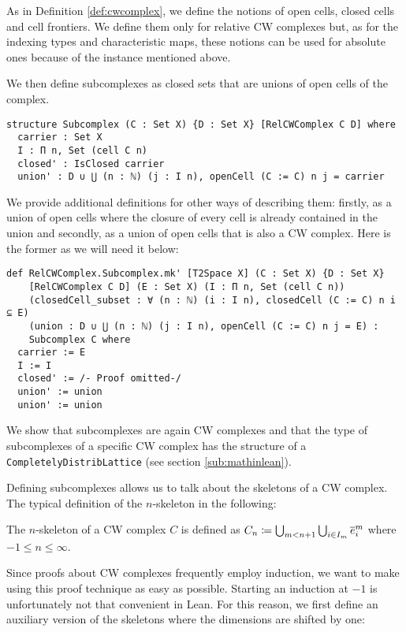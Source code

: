 As in Definition \ref{def:cwcomplex}, we define the notions of open cells, closed cells and cell frontiers.
We define them only for relative CW complexes but, as for the indexing types and characteristic maps, these notions can be used for absolute ones because of the instance mentioned above. 

We then define subcomplexes as closed sets that are unions of open cells of the complex.

\begin{lstlisting}[frame=single]
structure Subcomplex (C : Set X) {D : Set X} [RelCWComplex C D] where
  carrier : Set X
  I : Π n, Set (cell C n)
  closed' : IsClosed carrier
  union' : D ∪ ⋃ (n : ℕ) (j : I n), openCell (C := C) n j = carrier
\end{lstlisting}

We provide additional definitions for other ways of describing them: firstly, as a union of open cells where the closure of every cell is already contained in the union and secondly, as a union of open cells that is also a CW complex.
Here is the former as we will need it below:

\begin{lstlisting}[frame=single]
def RelCWComplex.Subcomplex.mk' [T2Space X] (C : Set X) {D : Set X} 
    [RelCWComplex C D] (E : Set X) (I : Π n, Set (cell C n))
    (closedCell_subset : ∀ (n : ℕ) (i : I n), closedCell (C := C) n i ⊆ E)
    (union : D ∪ ⋃ (n : ℕ) (j : I n), openCell (C := C) n j = E) : 
    Subcomplex C where
  carrier := E
  I := I
  closed' := /- Proof omitted-/
  union' := union
  union' := union
\end{lstlisting}

We show that subcomplexes are again CW complexes and that the type of subcomplexes of a specific CW complex has the structure of a \lstinline|CompletelyDistribLattice| (see section  \ref{sub:mathinlean}).  

Defining subcomplexes allows us to talk about the skeletons of a CW complex. 
The typical definition of the $n$-skeleton in the following: 

\begin{defi}
  The $n$-skeleton of a CW complex $C$ is defined as $C_n \coloneq \bigcup_{m < n + 1} \bigcup_{i \in I_m} \closedCell{m}{i}$ where $-1 \le n \le \infty$.
\end{defi}

Since proofs about CW complexes frequently employ induction, we want to make using this proof technique as easy as possible. 
Starting an induction at $-1$ is unfortunately not that convenient in Lean. 
For this reason, we first define an auxiliary version of the skeletons where the dimensions are shifted by one: 

